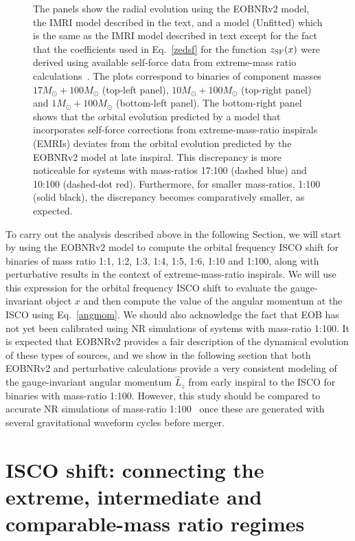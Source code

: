 \begin{figure}[ht]
\caption{The panels show the radial evolution using the EOBNRv2 model, the IMRI model described in the text, and a model (Unfitted) which is the same as the IMRI model described in text except for the fact that the coefficients used in Eq.~\eqref{zedsf} for the function  \(z_{\rm SF} (x)\) were derived using available self-force data from extreme-mass ratio calculations~\cite{barus}. The plots correspond to binaries of component masses \(17M_{\odot} + 100M_{\odot}\) (top-left panel), \(10M_{\odot} + 100M_{\odot}\) (top-right panel) and \(1M_{\odot} + 100M_{\odot}\) (bottom-left panel). The bottom-right panel shows that the orbital evolution predicted by a model that incorporates self-force corrections from extreme-mass-ratio inspirals (EMRIs) deviates from the orbital evolution predicted by the EOBNRv2 model at late inspiral. This discrepancy is more noticeable for systems with mass-ratios 17:100 (dashed blue) and 10:100 (dashed-dot red). Furthermore, for smaller mass-ratios, 1:100 (solid black), the 
discrepancy becomes comparatively smaller, as expected. }
\label{emimcomp}
\end{figure}



To carry out the analysis described above in the following Section, we will start by using the EOBNRv2 model to compute the orbital frequency ISCO shift for binaries of mass ratio 1:1, 1:2, 1:3, 1:4, 1:5, 1:6, 1:10 and 1:100, along with perturbative results in the context of extreme-mass-ratio inspirals. We will use this expression for the orbital frequency ISCO shift  to evaluate the gauge-invariant object \(x\)  and then compute the value of the angular momentum at the ISCO using Eq.~\eqref{angmom}.  We should also acknowledge the fact that EOB has not yet been calibrated using NR simulations of systems with mass-ratio 1:100. It is expected that EOBNRv2 provides a fair description of the dynamical evolution of these types of sources,  and we show in the following section that both EOBNRv2 and perturbative calculations provide a very consistent modeling of the gauge-invariant angular momentum \(\hat{L}_{z}\) from early inspiral to the ISCO for binaries with mass-ratio 1:100. However, this study should be 
compared to accurate NR simulations of mass-ratio 1:100~\cite{carlos} once these are generated with several gravitational waveform cycles before merger.


\clearpage


\section{ISCO shift: connecting the extreme, intermediate and comparable-mass ratio regimes}
\label{s3}

